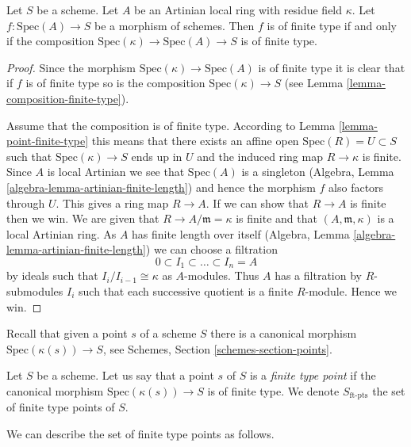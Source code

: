 \begin{lemma}
\label{lemma-artinian-finite-type}
Let $S$ be a scheme.
Let $A$ be an Artinian local ring with residue field $\kappa$.
Let $f : \text{Spec}(A) \to S$ be a morphism of schemes.
Then $f$ is of finite type if and only if the composition
$\text{Spec}(\kappa) \to \text{Spec}(A) \to S$ is of finite type.
\end{lemma}

\begin{proof}
Since the morphism $\text{Spec}(\kappa) \to \text{Spec}(A)$ is of finite
type it is clear that if $f$ is of finite type so is the composition
$\text{Spec}(\kappa) \to S$ (see Lemma \ref{lemma-composition-finite-type}).

\medskip\noindent
Assume that the composition is of finite type. According to
Lemma \ref{lemma-point-finite-type} this means that there exists
an affine open $\text{Spec}(R) = U \subset S$ such that
$\text{Spec}(\kappa) \to S$ ends up in $U$ and the induced ring map
$R \to \kappa$ is finite. Since $A$ is local Artinian we see that
$\text{Spec}(A)$ is a singleton
(Algebra, Lemma \ref{algebra-lemma-artinian-finite-length})
and hence the morphism $f$ also factors
through $U$. This gives a ring map $R \to A$. If we can show that $R \to A$
is finite then we win. We are given that $R \to A/\mathfrak m = \kappa$
is finite and that $(A, \mathfrak m, \kappa)$ is a local Artinian
ring. As $A$ has finite length over itself
(Algebra, Lemma \ref{algebra-lemma-artinian-finite-length})
we can choose a filtration
$$
0 \subset I_1 \subset \ldots \subset I_n = A
$$
by ideals such that $I_i/I_{i - 1} \cong \kappa$ as $A$-modules.
Thus $A$ has a filtration by $R$-submodules $I_i$ such that each
successive quotient is a finite $R$-module. Hence we win.
\end{proof}

\noindent
Recall that given a point $s$ of a scheme $S$ there is a canonical
morphism $\text{Spec}(\kappa(s)) \to S$, see
Schemes, Section \ref{schemes-section-points}.

\begin{definition}
\label{definition-finite-type-point}
Let $S$ be a scheme.
Let us say that a point $s$ of $S$ is a {\it finite type point}
if the canonical morphism $\text{Spec}(\kappa(s)) \to S$ is of finite type.
We denote $S_{\text{ft-pts}}$ the set of finite type points of $S$.
\end{definition}

\noindent
We can describe the set of finite type points as follows.

